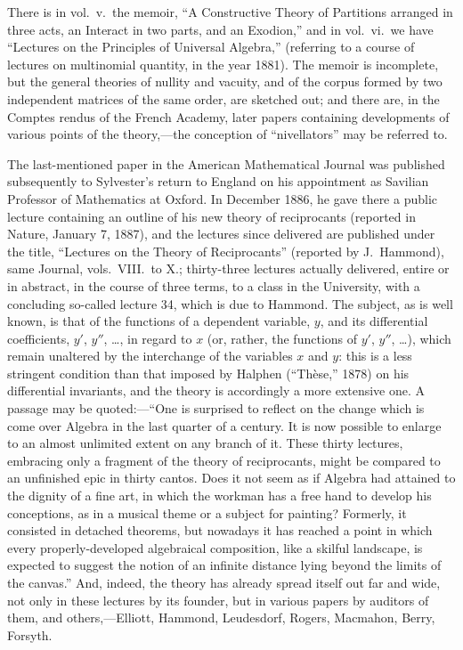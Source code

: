 \documentclass[11pt,a4paper]{book}
\begin{document}
There is in vol.\ v.\ the memoir, ``A Constructive Theory of Partitions arranged in three acts, an Interact in two parts, and an Exodion,'' and in vol.\ vi.\ we have ``Lectures on the Principles of Universal Algebra,'' (referring to a course of lectures on multinomial quantity, in the year 1881). The memoir is incomplete, but the general theories of nullity and vacuity, and of the corpus formed by two independent matrices of the same order, are sketched out; and there are, in the Comptes rendus of the French Academy, later papers containing developments of various points of the theory,---the conception of ``nivellators'' may be referred to.

The last-mentioned paper in the American Mathematical Journal was published subsequently to Sylvester's return to England on his appointment as Savilian Professor of Mathematics at Oxford. In December 1886, he gave there a public lecture containing an outline of his new theory of reciprocants (reported in Nature, January 7, 1887), and the lectures since delivered are published under the title, ``Lectures on the Theory of Reciprocants'' (reported by J.\ Hammond), same Journal, vols.\ VIII.\ to X.; thirty-three lectures actually delivered, entire or in abstract, in the course of three terms, to a class in the University, with a concluding so-called lecture 34, which is due to Hammond. The subject, as is well known, is that of the functions of a dependent variable, $y$, and its differential coefficients, $y'$, $y''$, \ldots, in regard to $x$ (or, rather, the functions of $y'$, $y''$, \ldots), which remain unaltered by the interchange of the variables $x$ and $y$: this is a less stringent condition than that imposed by Halphen (``Th\`ese,'' 1878) on his differential invariants, and the theory is accordingly a more extensive one. A passage may be quoted:---``One is surprised to reflect on the change which is come over Algebra in the last quarter of a century. It is now possible to enlarge to an almost unlimited extent on any branch of it. These thirty lectures, embracing only a fragment of the theory of reciprocants, might be compared to an unfinished epic in thirty cantos. Does it not seem as if Algebra had attained to the dignity of a fine art, in which the workman has a free hand to develop his conceptions, as in a musical theme or a subject for painting? Formerly, it consisted in detached theorems, but nowadays it has reached a point in which every properly-developed algebraical composition, like a skilful landscape, is expected to suggest the notion of an infinite distance lying beyond the limits of the canvas.'' And, indeed, the theory has already spread itself out far and wide, not only in these lectures by its founder, but in various papers by auditors of them, and others,---Elliott, Hammond, Leudesdorf, Rogers, Macmahon, Berry, Forsyth.
\end{document}
